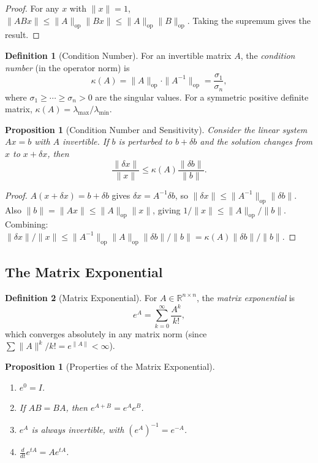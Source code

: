 \documentclass[11pt,a4paper]{article}
\theoremstyle{definition}
\newtheorem{definition}{Definition}[section]
\theoremstyle{plain}
\newtheorem{proposition}[theorem]{Proposition}
\theoremstyle{remark}
\newcommand{\R}{\mathbb{R}}
\begin{document}
\begin{proof}
For any $x$ with $\|x\| = 1$,
$\|ABx\| \leq \|A\|_{\text{op}} \|Bx\| \leq \|A\|_{\text{op}} \|B\|_{\text{op}}$.
Taking the supremum gives the result.
\end{proof}

\begin{definition}[Condition Number]
\label{def:condition_number}
For an invertible matrix $A$, the \emph{condition number} (in the operator norm) is
\[
    \kappa(A) = \|A\|_{\text{op}} \cdot \|A^{-1}\|_{\text{op}} = \frac{\sigma_1}{\sigma_n},
\]
where $\sigma_1 \geq \cdots \geq \sigma_n > 0$ are the singular values. For a symmetric
positive definite matrix, $\kappa(A) = \lambda_{\max}/\lambda_{\min}$.
\end{definition}

\begin{proposition}[Condition Number and Sensitivity]
\label{prop:condition_sensitivity}
Consider the linear system $Ax = b$ with $A$ invertible. If $b$ is perturbed to $b + \delta b$
and the solution changes from $x$ to $x + \delta x$, then
\[
    \frac{\|\delta x\|}{\|x\|} \leq \kappa(A) \frac{\|\delta b\|}{\|b\|}.
\]
\end{proposition}

\begin{proof}
$A(x + \delta x) = b + \delta b$ gives $\delta x = A^{-1} \delta b$, so
$\|\delta x\| \leq \|A^{-1}\|_{\text{op}} \|\delta b\|$. Also $\|b\| = \|Ax\| \leq
\|A\|_{\text{op}} \|x\|$, giving $1/\|x\| \leq \|A\|_{\text{op}} / \|b\|$. Combining:
$\|\delta x\| / \|x\| \leq \|A^{-1}\|_{\text{op}} \|A\|_{\text{op}} \|\delta b\| / \|b\|
= \kappa(A) \|\delta b\| / \|b\|$.
\end{proof}

\subsection{The Matrix Exponential}
\label{subsec:matrix_exp}

\begin{definition}[Matrix Exponential]
\label{def:matrix_exp}
For $A \in \R^{n \times n}$, the \emph{matrix exponential} is
\[
    e^A = \sum_{k=0}^{\infty} \frac{A^k}{k!},
\]
which converges absolutely in any matrix norm (since $\sum \|A\|^k / k! = e^{\|A\|} < \infty$).
\end{definition}

\begin{proposition}[Properties of the Matrix Exponential]
\label{prop:matrix_exp_properties}
\begin{enumerate}[nosep]
    \item $e^{0} = I$.
    \item If $AB = BA$, then $e^{A+B} = e^A e^B$.
    \item $e^A$ is always invertible, with $(e^A)^{-1} = e^{-A}$.
    \item $\frac{d}{dt} e^{tA} = A e^{tA}$.
\end{enumerate}
\end{proposition}
\end{document}
